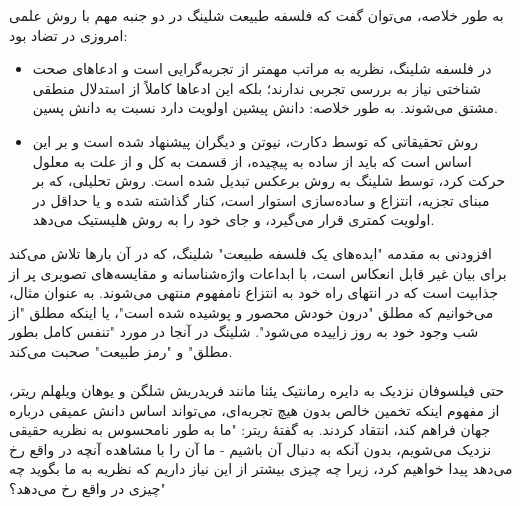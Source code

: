 \documentclass[10pt,a4paper]{article}
\begin{document}
                به طور خلاصه، می‌توان گفت که فلسفه طبیعت شلینگ در دو جنبه مهم با روش علمی امروزی در تضاد بود:
                \begin{itemize}
                    \item در فلسفه شلینگ، نظریه به مراتب مهمتر از تجربه‌گرایی است و ادعاهای صحت شناختی نیاز به بررسی تجربی ندارند؛ بلکه این ادعاها کاملاً از استدلال منطقی مشتق می‌شوند. به طور خلاصه: دانش پیشین اولویت دارد نسبت به دانش پسین.
                    \item روش تحقیقاتی که توسط دکارت، نیوتن و دیگران پیشنهاد شده است و بر این اساس است که باید از ساده به پیچیده، از قسمت به کل و از علت به معلول حرکت کرد، توسط شلینگ به روش برعکس تبدیل شده است. روش تحلیلی، که بر مبنای تجزیه، انتزاع و ساده‌سازی استوار است، کنار گذاشته شده و یا حداقل در اولویت کمتری قرار می‌گیرد، و جای خود را به روش هلیستیک می‌دهد.
                \end{itemize}
                افزودنی به مقدمه "ایده‌های یک فلسفه طبیعت" شلینگ، که در آن بارها تلاش می‌کند برای بیان غیر قابل انعکاس است، با ابداعات واژه‌شناسانه و مقایسه‌های تصویری پر از جذابیت است که در انتهای راه خود به انتزاع نامفهوم منتهی می‌شوند. به عنوان مثال، می‌خوانیم که مطلق "درون خودش محصور و پوشیده شده است"، یا اینکه مطلق "از شب وجود خود به روز زاییده می‌شود". شلینگ در آنجا در مورد "تنفس کامل بطور مطلق" و "رمز طبیعت" صحبت می‌کند.
                \\
                \\
حتی فیلسوفان نزدیک به دایره رمانتیک یئنا مانند فریدریش شلگن و یوهان ویلهلم ریتر، از مفهوم اینکه تخمین خالص بدون هیچ تجربه‌ای، می‌تواند اساس دانش عمیقی درباره جهان فراهم کند، انتقاد کردند. به گفتۀ ریتر: "ما به طور نامحسوس به نظریه حقیقی نزدیک می‌شویم، بدون آنکه به دنبال آن باشیم - ما آن را با مشاهده آنچه در واقع رخ می‌دهد پیدا خواهیم کرد، زیرا چه چیزی بیشتر از این نیاز داریم که نظریه به ما بگوید چه چیزی در واقع رخ می‌دهد؟"\cite{Kuppers2018-vv} 
    
\end{document}
